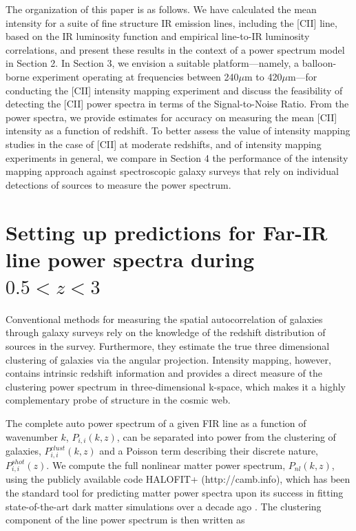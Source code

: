 \documentclass[12pt,preprint]{emulateapj}
\begin{document}
The organization of this paper is as follows. We have calculated the mean intensity for a suite of fine structure IR emission lines, including the [CII] line, based on the IR luminosity function and empirical line-to-IR luminosity correlations, and present these results in the context of a power spectrum model in Section 2. In Section 3, we envision a suitable platform---namely, a balloon-borne experiment operating at frequencies between 240$\mu$m to 420$\mu$m---for conducting the [CII] intensity mapping experiment and discuss the feasibility of detecting the [CII] power spectra in terms of the Signal-to-Noise Ratio. From the power spectra, we provide estimates for accuracy on measuring the mean [CII] intensity as a function of redshift. To better assess the value of intensity mapping studies in the case of [CII] at moderate redshifts, and of intensity mapping experiments in general, we compare in Section 4 the performance of the intensity mapping approach against spectroscopic galaxy surveys that rely on individual detections of sources to measure the power spectrum. 

\section{Setting up predictions for Far-IR line power spectra during $0.5 < z < 3$}

Conventional methods for measuring the spatial autocorrelation of galaxies through galaxy surveys rely on the knowledge of the redshift distribution of sources in the survey. Furthermore, they estimate the true three dimensional clustering of galaxies via the angular projection. Intensity mapping, however, contains intrinsic redshift information and provides a direct measure of the clustering power spectrum in three-dimensional k-space, which makes it a highly complementary probe of structure in the cosmic web. 

The complete auto power spectrum of a given FIR line as a function of wavenumber $k$, $P_{i,i}(k,z)$, can be separated into power from the clustering of galaxies, $P_{i,i}^{clust}(k,z)$ and a Poisson term describing their discrete nature, $P_{i,i}^{shot}(z)$. We compute the full nonlinear matter power spectrum, $P_{nl}(k, z)$, using the publicly available code HALOFIT+ (http://camb.info), which has been the standard tool for predicting matter power spectra upon its success in fitting state-of-the-art dark matter simulations over a decade ago \citep{halofit}.  The clustering component of the line power spectrum is then written as
\end{document}
